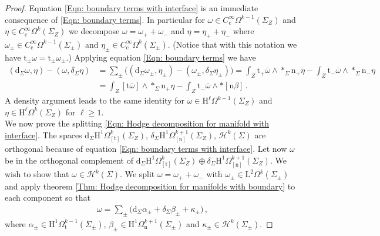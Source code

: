 \begin{proof}
	Equation \eqref{Eqn: boundary terms with interface} is an immediate consequence of \eqref{Eqn: boundary terms}.
	In particular for $\omega\in C^{\infty}_{\mathrm{c}}\Omega^{k-1}(\Sigma_Z)$ and $\eta\in C^{\infty}_{\mathrm{c}}\Omega^k(\Sigma_Z)$ we decompose $\omega=\omega_++\omega_-$ and $\eta=\eta_++\eta_-$ where $\omega_\pm\in C^\infty_{\mathrm{c}}\Omega^{k-1}(\Sigma_\pm)$ and $\eta_\pm\in C^\infty_{\mathrm{c}}\Omega^k(\Sigma_\pm)$.
	(Notice that with this notation we have $\mathrm{t}_\pm\omega=\mathrm{t}_\pm\omega_\pm$.)
	Applying equation \eqref{Eqn: boundary terms} we have
	\begin{align*}
		(\mathrm{d}_\Sigma\omega,\eta)-(\omega,\delta_\Sigma\eta)&=
		\sum_\pm\big((\mathrm{d}_\Sigma\omega_\pm,\eta_\pm)-(\omega_\pm,\delta_\Sigma\eta_\pm)\big)=
		\int_Z\mathrm{t}_+\overline{\omega}\wedge\ast_\Sigma\mathrm{n}_+\eta-
		\int_Z\mathrm{t}_-\overline{\omega}\wedge\ast_\Sigma\mathrm{n}_-\eta\\&=
		\int_Z[\mathrm{t}\overline{\omega}]\wedge\ast_{\Sigma}\mathrm{n}_+\eta-
		\int_Z\mathrm{t}_-\overline{\omega}\wedge\ast[\mathrm{n}\beta]\,.
	\end{align*}
	A density argument leads to the same identity for $\omega\in\mathrm{H}^\ell\Omega^{k-1}(\Sigma_Z)$ and $\eta\in\mathrm{H}^{\ell}\Omega^k(\Sigma_Z)$ for $\ell\geq 1$.
	\\
	We now prove the splitting \eqref{Eqn: Hodge decomposition for manifold with interface}.
	The spaces $\mathrm{d}_\Sigma \mathrm{H}^1\Omega^k_{[\mathrm{t}]}(\Sigma_Z)$, $\delta_\Sigma \mathrm{H}^1\Omega^{k+1}_{[\mathrm{n}]}(\Sigma_Z)$, $\mathcal{H}^k(\Sigma)$ are orthogonal because of equation \eqref{Eqn: boundary terms with interface}.
	Let now $\omega$ be in the orthogonal complement of $\mathrm{d}_\Sigma \mathrm{H}^1\Omega^k_{[\mathrm{t}]}(\Sigma_Z)\oplus\delta_\Sigma \mathrm{H}^1\Omega^{k+1}_{[\mathrm{n}]}(\Sigma_Z)$.
	We wish to show that $\omega\in\mathcal{H}^k(\Sigma)$.
	We split $\omega=\omega_++\omega_-$ with $\omega_\pm\in\mathrm{L}^2\Omega^k(\Sigma_\pm)$ and apply theorem \ref{Thm: Hodge decomposition for manifolds with boundary} to each component so that
	\begin{align*}
		\omega=
		\sum_\pm\big(\mathrm{d}_\Sigma\alpha_\pm+\delta_\Sigma\beta_\pm+\kappa_\pm\big)\,,
	\end{align*}
	where $\alpha_\pm\in\mathrm{H}^1\Omega^{k-1}_{\mathrm{t}}(\Sigma_\pm)$, $\beta_\pm\in\mathrm{H}^1\Omega^{k+1}_{\mathrm{n}}(\Sigma_\pm)$ and $\kappa_\pm\in\mathcal{H}^k(\Sigma_\pm)$.

\end{proof}
